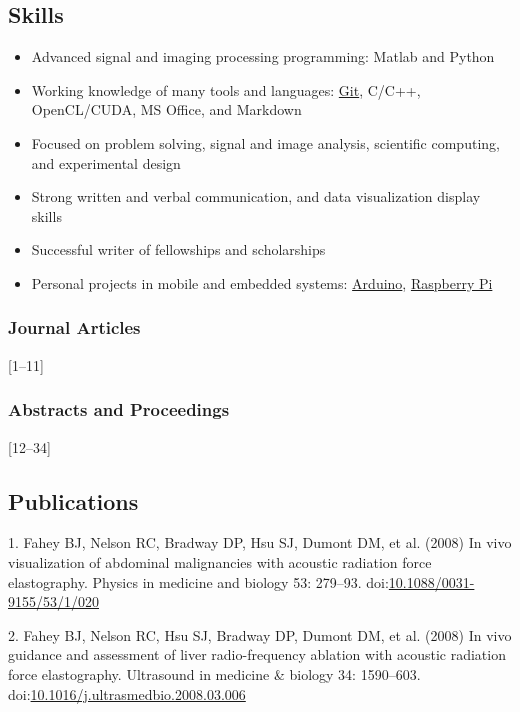 \documentclass[]{article}
\begin{document}
\subsection{Skills}\label{skills}

\begin{itemize}
\itemsep1pt\parskip0pt
\item
  Advanced signal and imaging processing programming: Matlab and Python
\item
  Working knowledge of many tools and languages:
  \href{http://git-scm.com/}{Git}, C/C++, OpenCL/CUDA, MS Office, and
  Markdown
\item
  Focused on problem solving, signal and image analysis, scientific
  computing, and experimental design
\item
  Strong written and verbal communication, and data visualization
  display skills
\item
  Successful writer of fellowships and scholarships
\item
  Personal projects in mobile and embedded systems:
  \href{http://www.arduino.cc/}{Arduino},
  \href{http://www.raspberrypi.org/}{Raspberry Pi}
\end{itemize}

\subsubsection{Journal Articles}\label{journal-articles}

{[}1--11{]}

\subsubsection{Abstracts and
Proceedings}\label{abstracts-and-proceedings}

{[}12--34{]}

\subsection{Publications}\label{publications}

1. Fahey BJ, Nelson RC, Bradway DP, Hsu SJ, Dumont DM, et al. (2008) In
vivo visualization of abdominal malignancies with acoustic radiation
force elastography. Physics in medicine and biology 53: 279--93.
doi:\href{http://dx.doi.org/10.1088/0031-9155/53/1/020}{10.1088/0031-9155/53/1/020}

2. Fahey BJ, Nelson RC, Hsu SJ, Bradway DP, Dumont DM, et al. (2008) In
vivo guidance and assessment of liver radio-frequency ablation with
acoustic radiation force elastography. Ultrasound in medicine \& biology
34: 1590--603.
doi:\href{http://dx.doi.org/10.1016/j.ultrasmedbio.2008.03.006}{10.1016/j.ultrasmedbio.2008.03.006}
\end{document}
